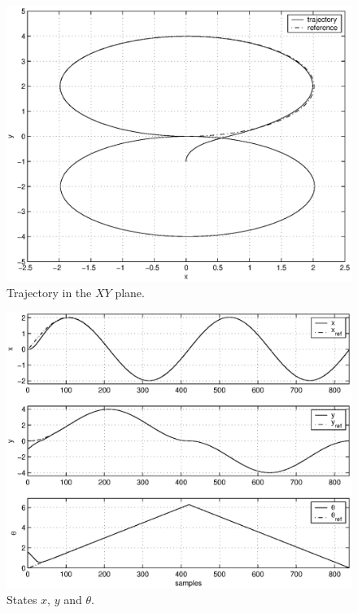 \documentclass[conference]{IEEEtran} %
\begin{document}
\begin{figure}[H]
	\centering
    \includegraphics[width=.9\linewidth]{Figures/traj8.eps}
    \caption{Trajectory in the $XY$ plane.}
    \label{fig:traj8}
\end{figure}
\begin{figure}
	\centering
    \includegraphics[width=.95\linewidth]{Figures/states.eps}
    \caption{States $x$, $y$ and $\theta$.}
    \label{fig:states}
\end{figure}
\end{document}
